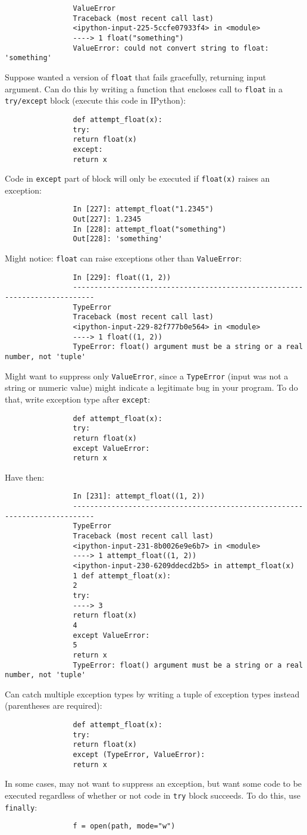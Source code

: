 \documentclass{article}
\begin{document}
\begin{itemize}
\begin{itemize}
\begin{itemize}
\begin{verbatim}
				ValueError
				Traceback (most recent call last)
				<ipython-input-225-5ccfe07933f4> in <module>
				----> 1 float("something")
				ValueError: could not convert string to float: 'something'
			\end{verbatim}
			Suppose wanted a version of {\tt float} that fails gracefully, returning input argument. Can do this by writing a function that encloses call to {\tt float} in a {\tt try/except} block (execute this code in IPython):
			\begin{verbatim}
				def attempt_float(x):
				try:
				return float(x)
				except:
				return x
			\end{verbatim}
			Code in {\tt except} part of block will only be executed if {\tt float(x)} raises an exception:
			\begin{verbatim}
				In [227]: attempt_float("1.2345")
				Out[227]: 1.2345
				In [228]: attempt_float("something")
				Out[228]: 'something'
			\end{verbatim}
			Might notice: {\tt float} can raise exceptions other than {\tt ValueError}:
			\begin{verbatim}
				In [229]: float((1, 2))
				---------------------------------------------------------------------------
				TypeError
				Traceback (most recent call last)
				<ipython-input-229-82f777b0e564> in <module>
				----> 1 float((1, 2))
				TypeError: float() argument must be a string or a real number, not 'tuple'
			\end{verbatim}
			Might want to suppress only {\tt ValueError}, since a {\tt TypeError} (input was not a string or numeric value) might indicate a legitimate bug in your program. To do that, write exception type after {\tt except}:
			\begin{verbatim}
				def attempt_float(x):
				try:
				return float(x)
				except ValueError:
				return x
			\end{verbatim}
			Have then:
			\begin{verbatim}
				In [231]: attempt_float((1, 2))
				---------------------------------------------------------------------------
				TypeError
				Traceback (most recent call last)
				<ipython-input-231-8b0026e9e6b7> in <module>
				----> 1 attempt_float((1, 2))
				<ipython-input-230-6209ddecd2b5> in attempt_float(x)
				1 def attempt_float(x):
				2
				try:
				----> 3
				return float(x)
				4
				except ValueError:
				5
				return x
				TypeError: float() argument must be a string or a real number, not 'tuple'
			\end{verbatim}
			Can catch multiple exception types by writing a tuple of exception types instead (parentheses are required):
			\begin{verbatim}
				def attempt_float(x):
				try:
				return float(x)
				except (TypeError, ValueError):
				return x
			\end{verbatim}
			In some cases, may not want to suppress an exception, but want some code to be executed regardless of whether or not code in {\tt try} block succeeds. To do this, use {\tt finally}:
			\begin{verbatim}
				f = open(path, mode="w")
				

\end{verbatim}
\end{itemize}
\end{itemize}
\end{itemize}
\end{document}
